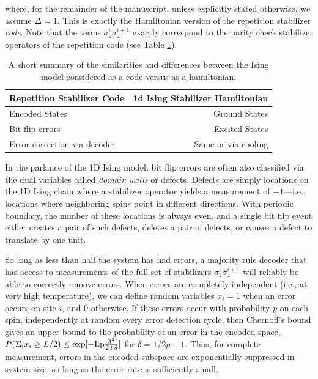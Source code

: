 \documentclass[twocolumn,superscriptaddress,aps,prb,floatfix]{revtex4-1}
\begin{document}
where, for the remainder of the manuscript, unless explicitly stated otherwise, we assume $\Delta=1$.  This is exactly the Hamiltonian version of the repetition stabilizer \emph{code}\cite{Freeman2016}.  Note that the terms $\sigma^i_z \sigma^{i+1}_z$ exactly correspond to the parity check stabilizer operators of the repetition code (see Table \ref{tab:code_vs_hamiltonian}).

\begin{table}
\begin{center}
  \begin{tabular}{ l | r }
    \hline
    Repetition Stabilizer Code & 1d Ising Stabilizer Hamiltonian \\ \hline
    Encoded States & Ground States \\ \hline
    Bit flip errors & Excited States \\ \hline
    Error correction via decoder & Same or via cooling \\ \hline
    \hline
  \end{tabular}
\end{center}
\caption{A short summary of the similarities and differences between the Ising model considered as a code versus as a hamiltonian.}
\label{tab:code_vs_hamiltonian}
\end{table}

In the parlance of the 1D Ising model, bit flip errors are often also classified via the dual variables called \emph{domain walls} or defects.  Defects are simply locations on the 1D Ising chain where a stabilizer operator yields a measurement of $-1$---i.e., locations where neighboring spins point in different directions.  With periodic boundary, the number of these locations is always even, and a single bit flip event either creates a pair of such defects, deletes a pair of defects, or causes a defect to translate by one unit.  

So long as less than half the system has had errors, a majority rule decoder that has access to measurements of the full set of stabilizers ${\sigma^i_z \sigma^{i+1}_z}$ will reliably be able to correctly remove errors.  When errors are completely independent (i.e., at very high temperature), we can define random variables $x_i=1$ when an error occurs on site $i$, and $0$ otherwise.  If these errors occur with probability $p$ on each spin, independently at random every error detection cycle, then Chernoff's bound gives an upper bound to the probability of an error in the encoded space, $P(\Sigma_i x_i \geq L/2) \leq \rm{exp}[-Lp\frac{\delta^2}{2+\delta}]$ for $\delta=1/2p-1$.  Thus, for complete measurement, errors in the encoded subspace are exponentially suppressed in system size, so long as the error rate is sufficiently small.
\end{document}
